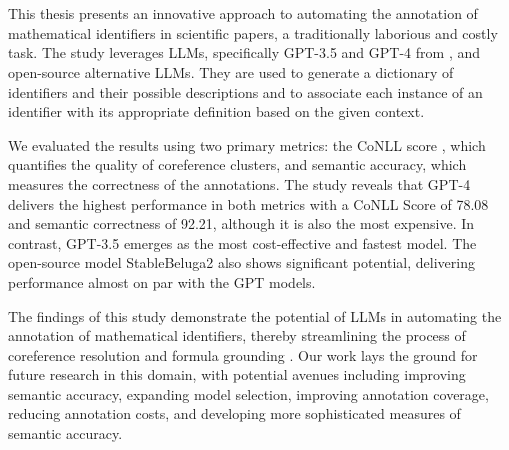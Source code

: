 \chapter{\abstractname}

This thesis presents an innovative approach to automating the annotation of mathematical identifiers in scientific papers, a traditionally laborious and costly task. The study leverages \ac{LLMs}, specifically GPT-3.5 and GPT-4 from \citet{openai2023}, and open-source alternative \ac{LLMs}. They are used to generate a dictionary of identifiers and their possible descriptions and to associate each instance of an identifier with its appropriate definition based on the given context. 

We evaluated the results using two primary metrics: the CoNLL score \citep{pradhan2012conll}, which quantifies the quality of coreference clusters, and semantic accuracy, which measures the correctness of the annotations. The study reveals that GPT-4 delivers the highest performance in both metrics with a CoNLL Score of 78.08 and semantic correctness of 92.21, although it is also the most expensive. In contrast, GPT-3.5 emerges as the most cost-effective and fastest model. The open-source model StableBeluga2 \citep{StableBelugaModels, touvron2023llama, mukherjee2023orca} also shows significant potential, delivering performance almost on par with the GPT models.

The findings of this study demonstrate the potential of LLMs in automating the annotation of mathematical identifiers, thereby streamlining the process of coreference resolution and formula grounding \citep{asakura2020towards}. Our work lays the ground for future research in this domain, with potential avenues including improving semantic accuracy, expanding model selection, improving annotation coverage, reducing annotation costs, and developing more sophisticated measures of semantic accuracy.
